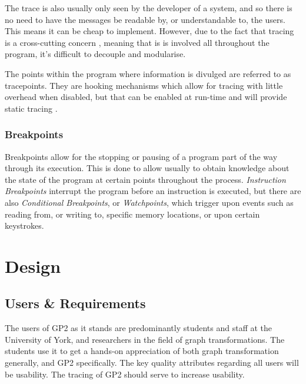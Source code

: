 \documentclass{UoYCSproject}
\begin{document}
The trace is also usually only seen by the developer of a system, and so there is no need to have the messages be readable by, or understandable to, the users. This means it can be cheap to implement. However, due to the fact that tracing is a cross-cutting concern \cite{wiki_tracing}, meaning that is is involved all throughout the program, it's difficult to decouple and modularise. %

The points within the program where information is divulged are referred to as tracepoints. They are hooking mechanisms which allow for tracing with little overhead when disabled, but that can be enabled at run-time and will provide static tracing \cite{tracing_book}.

\subsection{Breakpoints}
Breakpoints allow for the stopping or pausing of a program part of the way through its execution. This is done to allow usually to obtain knowledge about the state of the program at certain points throughout the process. \emph{Instruction Breakpoints} interrupt the program before an instruction is executed, but there are also \emph{Conditional Breakpoints}, or \emph{Watchpoints}, which trigger upon events such as reading from, or writing to, specific memory locations, or upon certain keystrokes.


\chapter{Design}
\section{Users \& Requirements} %

The users of GP2 as it stands are predominantly students and staff at the University of York, and researchers in the field of graph transformations. The students use it to get a hands-on appreciation of both graph transformation generally, and GP2 specifically. The key quality attributes regarding all users will be usability. The tracing of GP2 should serve to increase usability. 
\end{document}
